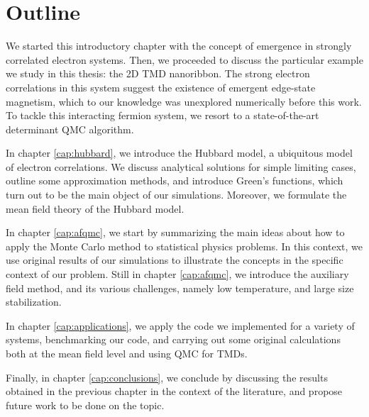 \section{Outline}
\label{sec:int_outline}

We started this introductory chapter with the concept of emergence in strongly correlated electron systems.
Then, we proceeded to discuss the particular example we study in this thesis: the \acs{2D} \acs{TMD} nanoribbon.
The strong electron correlations in this system suggest the existence of emergent edge-state magnetism, which to our knowledge was unexplored numerically before this work.
To tackle this interacting fermion system, we resort to a state-of-the-art determinant  \ac{QMC} algorithm.

In chapter \ref{cap:hubbard}, we introduce the Hubbard model, a ubiquitous model of electron correlations.
We discuss analytical solutions for simple limiting cases, outline some approximation methods, and introduce Green's functions, which turn out to be the main object of our simulations.
Moreover, we formulate the mean field theory of the Hubbard model.

In chapter \ref{cap:afqmc}, we start by summarizing the main ideas about how to apply the Monte Carlo method to statistical physics problems.
In this context, we use original results of our simulations to illustrate the concepts in the specific context of our problem.
Still in chapter \ref{cap:afqmc}, we introduce the auxiliary field method, and its various challenges, namely low temperature, and large size stabilization.

In chapter \ref{cap:applications}, we apply the code we implemented for a variety of systems, benchmarking our code, and carrying out some original calculations both at the mean field level and using \acs{QMC} for \acp{TMD}.

Finally, in chapter \ref{cap:conclusions}, we conclude by discussing the results obtained in the previous chapter in the context of the literature, and propose future work to be done on the topic.